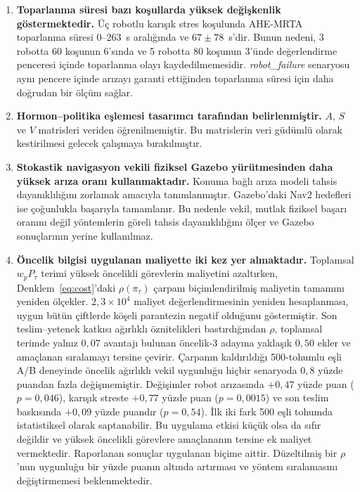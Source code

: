 \documentclass[10pt,letterpaper,onecolumn]{IEEEtran}
\begin{document}
\begin{enumerate}
  \item \textbf{Toparlanma süresi bazı koşullarda yüksek değişkenlik
  göstermektedir.} Üç robotlu karışık stres koşulunda AHE-MRTA toparlanma
  süresi 0--263~s aralığında ve $67\pm78$~s'dir. Bunun nedeni, 3 robotta 60
  koşunun 6'sında ve 5 robotta 80 koşunun 3'ünde değerlendirme penceresi içinde
  toparlanma olayı kaydedilmemesidir. \textit{robot\_failure} senaryosu aynı
  pencere içinde arızayı garanti ettiğinden toparlanma süresi için daha
  doğrudan bir ölçüm sağlar.

  \item \textbf{Hormon--politika eşlemesi tasarımcı tarafından
  belirlenmiştir.} $A$, $S$ ve $V$ matrisleri veriden öğrenilmemiştir. Bu
  matrislerin veri güdümlü olarak kestirilmesi gelecek çalışmaya bırakılmıştır.

  \item \textbf{Stokastik navigasyon vekili fiziksel Gazebo yürütmesinden daha
  yüksek arıza oranı kullanmaktadır.} Konuma bağlı arıza modeli tahsis
  dayanıklılığını zorlamak amacıyla tanımlanmıştır. Gazebo'daki Nav2 hedefleri
  ise çoğunlukla başarıyla tamamlanır. Bu nedenle vekil, mutlak fiziksel başarı
  oranını değil yöntemlerin göreli tahsis dayanıklılığını ölçer ve Gazebo
  sonuçlarının yerine kullanılmaz.

  \item \textbf{Öncelik bilgisi uygulanan maliyette iki kez yer almaktadır.}
  Toplamsal $w_pP_\tau$ terimi yüksek öncelikli görevlerin maliyetini azaltırken,
  Denklem~\eqref{eq:cost}'daki $\rho(\pi_\tau)$ çarpanı biçimlendirilmiş
  maliyetin tamamını yeniden ölçekler. $2{,}3{\times}10^{4}$ maliyet
  değerlendirmesinin yeniden hesaplanması, uygun bütün çiftlerde köşeli
  parantezin negatif olduğunu göstermiştir. Son teslim--yetenek katkısı
  ağırlıklı öznitelikleri bastırdığından $\rho$, toplamsal terimde yalnız
  $0{,}07$ avantajı bulunan öncelik-3 adayına yaklaşık $0{,}50$ ekler ve
  amaçlanan sıralamayı tersine çevirir. Çarpanın kaldırıldığı 500-tohumlu eşli
  A/B deneyinde öncelik ağırlıklı vekil uygunluğu hiçbir senaryoda $0{,}8$
  yüzde puandan fazla değişmemiştir. Değişimler robot arızasında
  $+0{,}47$ yüzde puan ($p{=}0{,}046$), karışık streste $+0{,}77$ yüzde puan
  ($p{=}0{,}0015$) ve son teslim baskısında $+0{,}09$ yüzde puandır
  ($p{=}0{,}54$). İlk iki fark 500 eşli tohumda istatistiksel olarak
  saptanabilir. Bu uygulama etkisi küçük olsa da sıfır değildir ve yüksek
  öncelikli görevlere amaçlananın tersine ek maliyet vermektedir. Raporlanan
  sonuçlar uygulanan biçime aittir. Düzeltilmiş bir $\rho$'nun uygunluğu bir
  yüzde puanın altında artırması ve yöntem sıralamasını değiştirmemesi
  beklenmektedir.


\end{enumerate}
\end{document}
